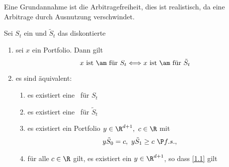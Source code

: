 	Eine Grundannahme ist die Arbitragefreiheit, dies ist realistisch, da eine Arbitrage durch Ausnutzung verschwindet.
	\begin{lem}
		Sei $S_t$ ein \epm und $\tilde{S}_t$ das diskontierte \epm
		\begin{enumerate}
			\item sei $x$ ein Portfolio. Dann gilt \[x\text{ ist \am\ für }S_t\Longleftrightarrow x\text{ ist \am\ für }\tilde{S}_t\]
			\item es sind äquivalent:
			\begin{enumerate}
				\item es existiert eine \am\ für $S_t$
				\item es existiert eine \am\ für $\tilde{S}_t$
				\item es existiert ein Portfolio $y\in\R^{d+1},\ c\in \R$ mit 
				\begin{align}\label{1.1}
					y\tilde{S}_0=c,\ y\tilde{S}_1\ge c\ \P f.s.,\ 
				\end{align}
				\item für alle $c\in\R$ gilt, es existiert ein $y\in\R^{d+1}$, so dass \ref{1.1} gilt
			\end{enumerate}
		\end{enumerate}
	\end{lem}
